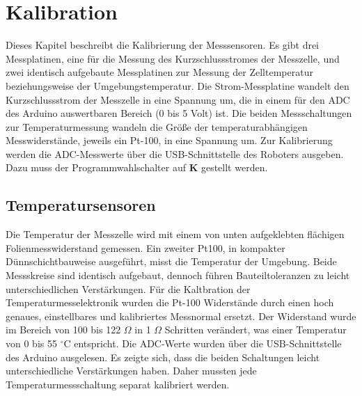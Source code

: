 \documentclass[a4paper,bibtotoc,oneside]{scrbook}
\begin{document}
\chapter{Kalibration}\thispagestyle{empty}

Dieses Kapitel beschreibt die Kalibrierung der Messsensoren. Es gibt drei Messplatinen, eine für die Messung des Kurzschlussstromes der Messzelle, und zwei identisch aufgebaute Messplatinen zur Messung der Zelltemperatur beziehungsweise der Umgebungstemperatur. Die Strom-Messplatine wandelt den Kurzschlussstrom der Messzelle in eine Spannung um, die in einem für den ADC des Arduino auswertbaren Bereich (0 bis 5 Volt) ist. Die beiden Messschaltungen zur Temperaturmessung wandeln die Größe der temperaturabhängigen Messwiderstände, jeweils ein Pt-100, in eine Spannung um.
Zur Kalibrierung werden die ADC-Messwerte über die USB-Schnittstelle des Roboters ausgeben. Dazu muss der Programmwahlschalter auf \textbf{K} gestellt werden.


\section{Temperatursensoren}\thispagestyle{empty}
Die Temperatur der Messzelle wird mit einem von unten aufgeklebten flächigen Folienmesswiderstand gemessen. 
Ein zweiter Pt100, in kompakter Dünnschichtbauweise ausgeführt, misst die Temperatur der Umgebung. Beide Messskreise sind identisch aufgebaut, dennoch führen Bauteiltoleranzen zu leicht unterschiedlichen Verstärkungen.
Für die Kaltbration der Temperaturmesselektronik wurden die Pt-100 Widerstände durch einen hoch genaues, einstellbares und kalibriertes Messnormal ersetzt. Der Widerstand wurde im Bereich von 100 bis 122 	$\Omega$  in 1 $\Omega$  Schritten verändert, was einer Temperatur von 0 bis 55 $^{\circ}$C entspricht. Die ADC-Werte wurden über die USB-Schnittstelle des Arduino ausgelesen. Es zeigte sich, dass die beiden Schaltungen leicht unterschiedliche Verstärkungen haben. Daher mussten jede Temperaturmessschaltung separat kalibriert werden.
\end{document}
